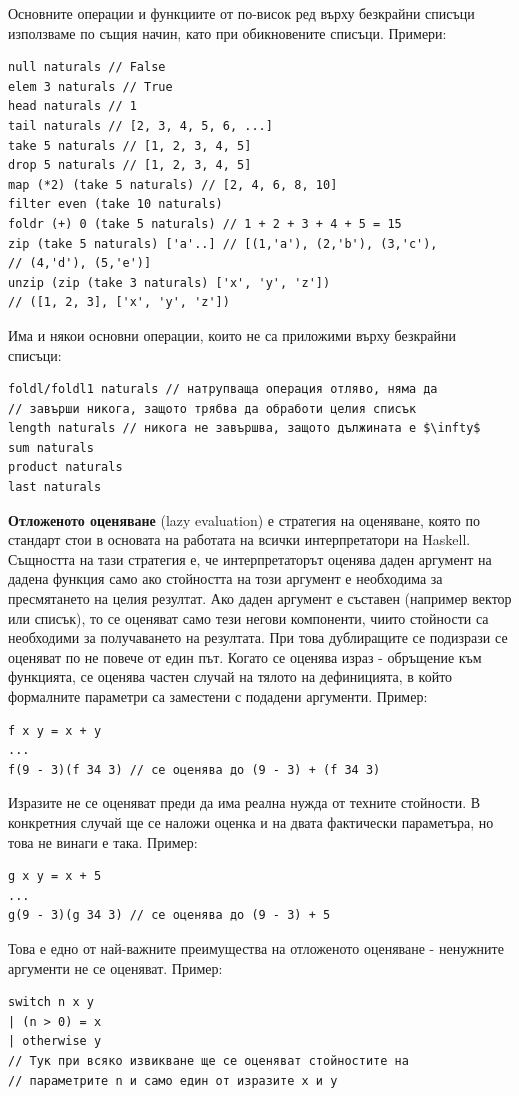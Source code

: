\documentclass{article}
\begin{document}
Основните операции и функциите от по-висок ред върху безкрайни списъци използваме по същия начин, като при обикновените списъци. \newline\newline
Примери:
\begin{lstlisting}[style=cpp]
null naturals // False
elem 3 naturals // True
head naturals // 1
tail naturals // [2, 3, 4, 5, 6, ...]
take 5 naturals // [1, 2, 3, 4, 5]
drop 5 naturals // [1, 2, 3, 4, 5]
map (*2) (take 5 naturals) // [2, 4, 6, 8, 10]
filter even (take 10 naturals)
foldr (+) 0 (take 5 naturals) // 1 + 2 + 3 + 4 + 5 = 15
zip (take 5 naturals) ['a'..] // [(1,'a'), (2,'b'), (3,'c'),
// (4,'d'), (5,'e')]
unzip (zip (take 3 naturals) ['x', 'y', 'z'])
// ([1, 2, 3], ['x', 'y', 'z'])
\end{lstlisting}
Има и някои основни операции, които не са приложими върху безкрайни списъци:
\begin{lstlisting}[style=cpp]
foldl/foldl1 naturals // натрупваща операция отляво, няма да
// завърши никога, защото трябва да обработи целия списък
length naturals // никога не завършва, защото дължината е $\infty$
sum naturals
product naturals
last naturals
\end{lstlisting}
\textbf{Отложеното оценяване} (lazy evaluation) е стратегия на оценяване, която по стандарт стои в основата на работата на всички интерпретатори на
Haskell. Същността на тази стратегия е, че интерпретаторът оценява даден аргумент на дадена функция само ако стойността на този аргумент е
необходима за пресмятането на целия резултат. Ако даден аргумент е съставен (например вектор или списък), то се оценяват само тези негови
компоненти, чиито стойности са необходими за получаването на резултата. При това дублиращите се подизрази се оценяват по не повече от един път.
Когато се оценява израз - обръщение към функцията, се оценява частен случай на тялото на дефиницията, в който формалните параметри са заместени с
подадени аргументи. \newline\newline
Пример:
\begin{lstlisting}[style=cpp]
f x y = x + y
...
f(9 - 3)(f 34 3) // се оценява до (9 - 3) + (f 34 3)
\end{lstlisting}
Изразите не се оценяват преди да има реална нужда от техните стойности. В конкретния случай ще се наложи оценка и на двата фактически параметъра,
но това не винаги е така. \newline\newline
Пример:
\begin{lstlisting}[style=cpp]
g x y = x + 5
...
g(9 - 3)(g 34 3) // се оценява до (9 - 3) + 5
\end{lstlisting}
Това е едно от най-важните преимущества на отложеното оценяване - ненужните аргументи не се оценяват. \newline\newline
Пример:
\begin{lstlisting}[style=cpp]
switch n x y
| (n > 0) = x
| otherwise y
// Тук при всяко извикване ще се оценяват стойностите на
// параметрите n и само един от изразите x и y
\end{lstlisting}
\end{document}
